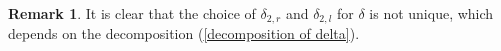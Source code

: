 \documentclass[a4paper,10pt]{amsart}
\newtheorem{lemma}[theorem]{Lemma}
\theoremstyle{definition}
\newtheorem{remark}[theorem]{Remark}
\numberwithin{equation}{section}
\begin{document}
\begin{remark}
It is clear that the choice of $\delta_{2,r}$ and $\delta_{2,l}$ for $\delta$ is not unique, which depends on the decomposition (\ref{decomposition of delta}).
\end{remark}

%









%
%
\end{document}
